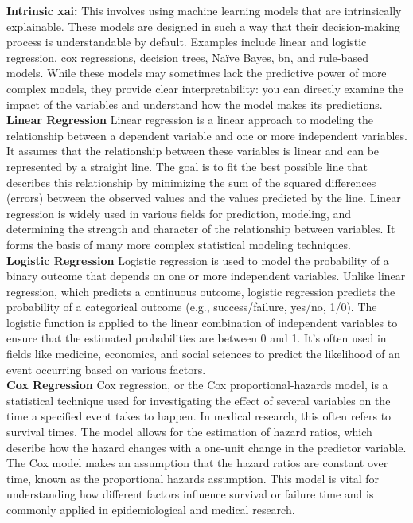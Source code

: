 \textbf{Intrinsic \ac{xai}:} This involves using machine learning models that are intrinsically explainable. These models are designed in such a way that their decision-making process is understandable by default. Examples include linear and logistic regression, cox regressions, decision trees, Naïve Bayes, \ac{bn}, and rule-based models. While these models may sometimes lack the predictive power of more complex models, they provide clear interpretability: you can directly examine the impact of the variables and understand how the model makes its predictions.
\\
\textbf{Linear Regression}
Linear regression is a linear approach to modeling the relationship between a dependent variable and one or more independent variables. It assumes that the relationship between these variables is linear and can be represented by a straight line. The goal is to fit the best possible line that describes this relationship by minimizing the sum of the squared differences (errors) between the observed values and the values predicted by the line. Linear regression is widely used in various fields for prediction, modeling, and determining the strength and character of the relationship between variables. It forms the basis of many more complex statistical modeling techniques.
\\
\textbf{Logistic Regression}
Logistic regression is used to model the probability of a binary outcome that depends on one or more independent variables. Unlike linear regression, which predicts a continuous outcome, logistic regression predicts the probability of a categorical outcome (e.g., success/failure, yes/no, 1/0). The logistic function is applied to the linear combination of independent variables to ensure that the estimated probabilities are between 0 and 1. It's often used in fields like medicine, economics, and social sciences to predict the likelihood of an event occurring based on various factors.
\\
\textbf{Cox Regression}
Cox regression, or the Cox proportional-hazards model, is a statistical technique used for investigating the effect of several variables on the time a specified event takes to happen. In medical research, this often refers to survival times. The model allows for the estimation of hazard ratios, which describe how the hazard changes with a one-unit change in the predictor variable. The Cox model makes an assumption that the hazard ratios are constant over time, known as the proportional hazards assumption. This model is vital for understanding how different factors influence survival or failure time and is commonly applied in epidemiological and medical research.

